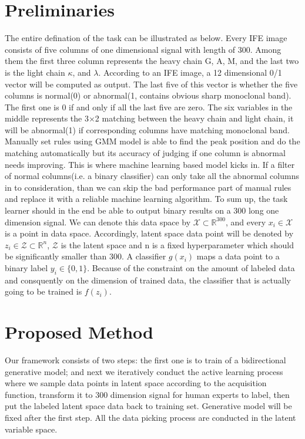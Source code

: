 \documentclass[letterpaper]{article}
\begin{document}
\section{Preliminaries}
The entire defination of the task can be illustrated as below. Every IFE image consists of five columns of one dimensional signal with length of 300. Among them the first three column represents the heavy chain G, A, M, and the last two is the light chain $\kappa$, and $\lambda$. According to an IFE image, a 12 dimensional 0/1 vector will be computed as output. The last five of this vector is whether the five columns is normal(0) or abnormal(1, contains obvious sharp monoclonal band). The first one is 0 if and only if all the last five are zero. The six variables in the middle represents the 3$\times$2 matching between the heavy chain and light chain, it will be abnormal(1) if corresponding columns have matching monoclonal band. Manually set rules using GMM model is able to find the peak position and do the matching automatically but its accuracy of judging if one column is abnormal needs improving. This is where machine learning based model kicks in. If a filter of normal columns(i.e. a binary classifier) can only take all the abnormal columns in to consideration, than we can skip the bad performance part of manual rules and replace it with a reliable machine learning algorithm. To sum up, the task learner should in the end be able to output binary results on a 300 long one dimension signal. We can denote this data space by $\mathcal{X} \subset \mathbb{R}^{300}$, and every $x_i \in \mathcal{X}$ is a point in data space. Accordingly, latent space data point will be denoted by $z_i \in \mathcal{Z} \subset \mathbb{R}^n$, $\mathcal{Z}$ is the latent space and n is a fixed hyperparameter which should be significantly smaller than 300. A classifier $g(x_i)$ maps a data point to a binary label $y_i \in \{0,1\}$. Because of the constraint on the amount of labeled data and consquently on the dimension of trained data, the classifier that is actually going to be trained is $f(z_i)$.

\section{Proposed Method}
Our framework consists of two steps: the first one is to train of a bidirectional generative model; and next we iteratively conduct the active learning process where we sample data points in latent space according to the acquisition function, transform it to 300 dimension signal for human experts to label, then put the labeled latent space data back to training set. Generative model will be fixed after the first step. All the data picking process are conducted in the latent variable space.
\end{document}
